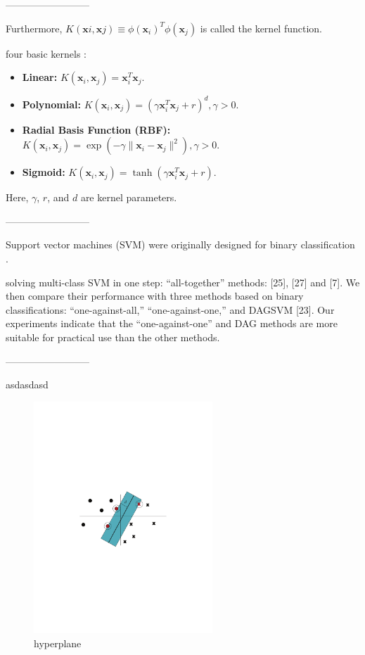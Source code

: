 --------------------------

Furthermore, $K(\bm{x}i, \bm{x}j ) \equiv \phi(\bm{x}_i)^T \phi(\bm{x}_j)$ is called the kernel function.

four basic kernels \cite{hsu2003practical}:

\begin{itemize}
\item \textbf{Linear:} $K(\bm{x}_i,\bm{x}_j) = \bm{x}^T_i \bm{x}_j$.
\item \textbf{Polynomial:} $K(\bm{x}_i,\bm{x}_j) = (\gamma \bm{x}^T_i \bm{x}_j + r)^d, \gamma > 0$.
\item \textbf{Radial Basis Function (RBF):} $K(\bm{x}_i,\bm{x}_j) = \exp(−\gamma \lVert \bm{x}_i − \bm{x}_j \rVert ^2),\gamma > 0$.
\item \textbf{Sigmoid:} $K(\bm{x}_i,\bm{x}_j) = \tanh(\gamma \bm{x}^T_i\bm{x}_j + r)$.
\end{itemize}

Here, $\gamma$, $r$, and $d$ are kernel parameters.

--------------------------

Support vector machines (SVM) were originally designed for binary classification \cite{hsu2002comparison}.

solving multi-class SVM in one step: “all-together” methods: [25], [27] and [7]. We then compare their performance with three methods based on binary classifications: “one-against-all,” “one-against-one,” and DAGSVM [23]. Our experiments indicate that the “one-against-one” and DAG methods are more suitable for practical use than the other methods. 

--------------------------

asdasdasd \cite{berwick2003idiot}

\begin{figure}[!htp]
  \center
  \includegraphics[width=0.6\textwidth]{figures/hyperplane}
  \caption{hyperplane}
  \label{fig:hyperplane}
\end{figure}

